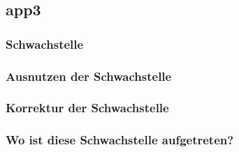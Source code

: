 \documentclass[12pt,a4paper,titlepage,oneside]{scrartcl}
\begin{document}

\subsection{app3}

\subsubsection{Schwachstelle}

\subsubsection{Ausnutzen der Schwachstelle}

\subsubsection{Korrektur der Schwachstelle}

\subsubsection{Wo ist diese Schwachstelle aufgetreten?}

\begin{itemize}
\end{itemize}

%
%
\end{document}
